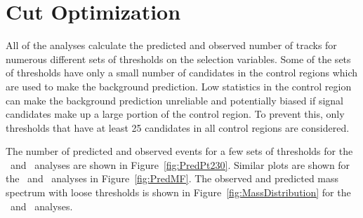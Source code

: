 \section{Cut Optimization \label{sec:Optim}}
All of the analyses calculate the predicted and observed number of tracks for numerous different sets of thresholds on the selection variables.
Some of the sets of thresholds have only a small number of candidates in the control regions which are used to make the background prediction.
Low statistics in the control region can make the background prediction unreliable and potentially biased if signal candidates make up a large portion of the control region.
To prevent this, only thresholds that have at least 25 candidates in all control regions are considered. 

The number of predicted and observed events for a few sets of thresholds for the \muononly\ and \tktof\ analyses are shown in Figure~\ref{fig:PredPt230}. 
Similar plots are shown for the \tkonly\ and \multi\ analyses in Figure~\ref{fig:PredMF}.
The observed and predicted mass spectrum with loose thresholds is shown in Figure~\ref{fig:MassDistribution} for the
\tktof\ and \tkonly\ analyses.

